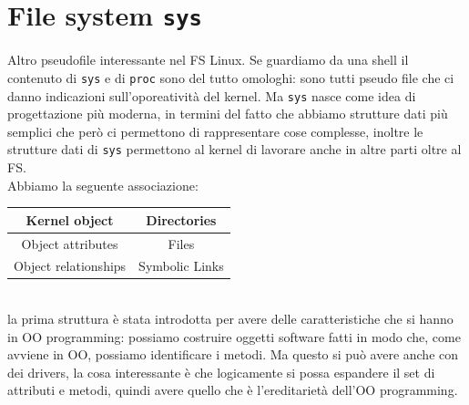 \documentclass[12pt, oneside]{extbook}
\begin{document}
\section{File system \texttt{sys}}
Altro pseudofile interessante nel FS Linux. Se guardiamo da una shell il contenuto di \texttt{sys} e di \texttt{proc} sono del tutto omologhi: sono tutti pseudo file che ci danno indicazioni sull'oporeatività del kernel. Ma \texttt{sys} nasce come idea di progettazione più moderna, in termini del fatto che abbiamo strutture dati più semplici che però ci permettono di rappresentare cose complesse, inoltre le strutture dati di \texttt{sys} permettono al kernel di lavorare anche in altre parti oltre al FS.\\Abbiamo la seguente associazione:
\begin{table}[!h]
	\begin{tabular}{|c | c|}
		\hline
		Kernel object & Directories\\
		\hline
		Object attributes & Files\\
		\hline
		Object relationships & Symbolic Links\\
		\hline
	\end{tabular}
\end{table}
\\la prima struttura è stata introdotta per avere delle caratteristiche che si hanno in OO programming: possiamo costruire oggetti software fatti in modo che, come avviene in OO, possiamo identificare i metodi. Ma questo si può avere anche con dei drivers, la cosa interessante è che logicamente si possa espandere il set di attributi e metodi, quindi avere quello che è l'ereditarietà dell'OO programming.
\end{document}
